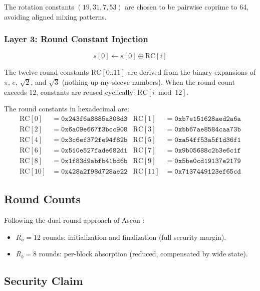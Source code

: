 \documentclass[11pt,a4paper]{article}
\begin{document}
The rotation constants $(19, 31, 7, 53)$ are chosen to be pairwise
coprime to 64, avoiding aligned mixing patterns.

\subsubsection{Layer 3: Round Constant Injection}

$$s[0] \leftarrow s[0] \oplus \mathrm{RC}[i]$$

The twelve round constants $\mathrm{RC}[0..11]$ are derived from the
binary expansions of $\pi$, $e$, $\sqrt{2}$, and $\sqrt{3}$
(nothing-up-my-sleeve numbers). When the round count exceeds 12,
constants are reused cyclically: $\mathrm{RC}[i \bmod 12]$.

The round constants in hexadecimal are:
{\small
\begin{align*}
\mathrm{RC}[0]  &= \mathtt{0x243f6a8885a308d3} & \mathrm{RC}[1]  &= \mathtt{0xb7e151628aed2a6a} \\
\mathrm{RC}[2]  &= \mathtt{0x6a09e667f3bcc908} & \mathrm{RC}[3]  &= \mathtt{0xbb67ae8584caa73b} \\
\mathrm{RC}[4]  &= \mathtt{0x3c6ef372fe94f82b} & \mathrm{RC}[5]  &= \mathtt{0xa54ff53a5f1d36f1} \\
\mathrm{RC}[6]  &= \mathtt{0x510e527fade682d1} & \mathrm{RC}[7]  &= \mathtt{0x9b05688c2b3e6c1f} \\
\mathrm{RC}[8]  &= \mathtt{0x1f83d9abfb41bd6b} & \mathrm{RC}[9]  &= \mathtt{0x5be0cd19137e2179} \\
\mathrm{RC}[10] &= \mathtt{0x428a2f98d728ae22} & \mathrm{RC}[11] &= \mathtt{0x7137449123ef65cd}
\end{align*}
}

\subsection{Round Counts}

Following the dual-round approach of Ascon \cite{ascon}:
\begin{itemize}
    \item $R_a = 12$ rounds: initialization and finalization (full
          security margin).
    \item $R_b = 8$ rounds: per-block absorption (reduced, compensated
          by wide state).
\end{itemize}

\subsection{Security Claim}
\end{document}
